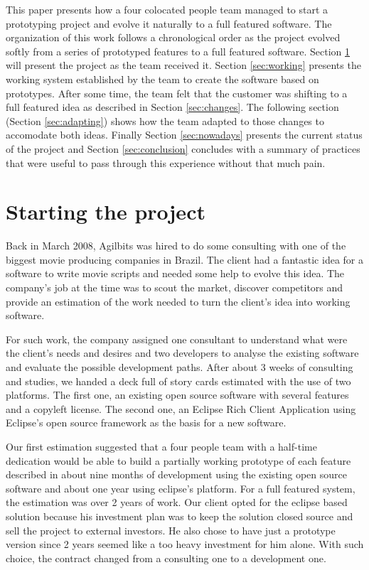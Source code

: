 \documentclass[lnbip]{svmultln}
\begin{document}
This paper presents how a four colocated people team managed to start
a prototyping project and evolve it naturally to a full featured
software. The organization of this work follows a chronological order
as the project evolved softly from a series of prototyped features to
a full featured software. Section \ref{sec:start} will present the
project as the team received it. Section \ref{sec:working} presents
the working system established by the team to create the software
based on prototypes. After some time, the team felt that the customer
was shifting to a full featured idea as described in Section
\ref{sec:changes}. The following section (Section \ref{sec:adapting})
shows how the team adapted to those changes to accomodate both
ideas. Finally Section \ref{sec:nowadays} presents the current status
of the project and Section \ref{sec:conclusion} concludes with a
summary of practices that were useful to pass through this experience
without that much pain.

\section{Starting the project}
\label{sec:start}

Back in March 2008, Agilbits was hired to do some consulting with one
of the biggest movie producing companies in Brazil. The client had a
fantastic idea for a software to write movie scripts and needed some
help to evolve this idea. The company's job at the time was to scout
the market, discover competitors and provide an estimation of the work
needed to turn the client's idea into working software.

For such work, the company assigned one consultant to understand what
were the client's needs and desires and two developers to analyse the
existing software and evaluate the possible development paths. After
about 3 weeks of consulting and studies, we handed a deck full of
story cards estimated with the use of two platforms. The first one, an
existing open source software with several features and a copyleft
license. The second one, an Eclipse Rich Client Application using
Eclipse's open source framework as the basis for a new software.

Our first estimation suggested that a four people team with a
half-time dedication would be able to build a partially working
prototype of each feature described in about nine months of
development using the existing open source software and about one year
using eclipse's platform. For a full featured system, the estimation
was over 2 years of work. Our client opted for the eclipse based
solution because his investment plan was to keep the solution closed
source and sell the project to external investors. He also chose to
have just a prototype version since 2 years seemed like a too heavy
investment for him alone. With such choice, the contract changed from
a consulting one to a development one.
\end{document}
